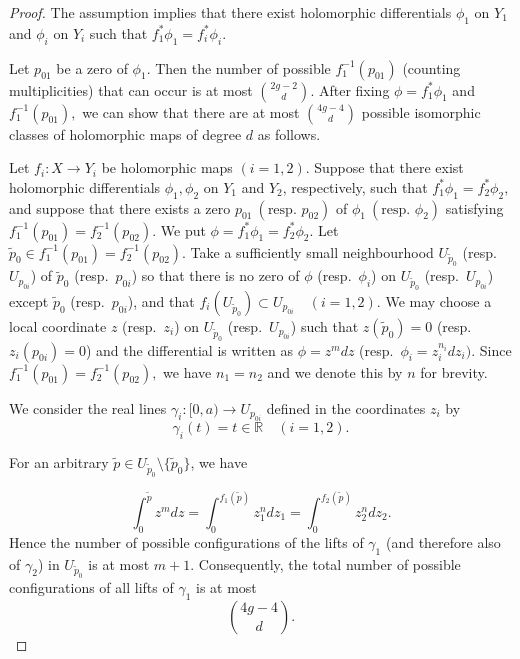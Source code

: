 \documentclass[11pt]{article}
\numberwithin{equation}{section}
\theoremstyle{plain}
\begin{document}
\begin{proof}
The assumption implies that there exist holomorphic differentials
$\phi_{1}
$ on \(Y_{1}\) and
$\phi_{i}
$ on \(Y_{i}\) such that 
$f_{1}^{*}\phi_{1}=f_{i}^{*}\phi_{i}.
$

Let \(p_{01}\) be a zero of \(\phi_{1}\). Then the number of possible
$f_{1}^{-1}(p_{01})
$ (counting multiplicities) that can occur is at most
$\binom{2g-2}{d}.
$ After fixing
$\phi=f_{1}^{*}\phi_{1}
$ and
$f_{1}^{-1}(p_{01}),
$ we can show that there are at most
$\binom{4g-4}{d}
$ possible isomorphic classes of holomorphic maps of degree \(d\) as follows.

Let
$f_{i}:X\to Y_{i}
$ be holomorphic maps \((i=1,2)\).
Suppose that there exist holomorphic differentials
$\phi_{1},\phi_{2}
$ on $Y_{1}$ and $Y_{2}$, respectively, such that
$f_{1}^{*}\phi_{1}=f_{2}^{*}\phi_{2},
$ and suppose that there exists a zero
$p_{01}\ (\text{resp. }p_{02})
$ of
$\phi_{1}\ (\text{resp. }\phi_{2})
$ satisfying
$f_{1}^{-1}(p_{01})=f_{2}^{-1}(p_{02}).
$ We put
$\phi=f_{1}^{*}\phi_{1}=f_{2}^{*}\phi_{2}.
$ Let
$\tilde p_{0}\in f_{1}^{-1}(p_{01})=f_{2}^{-1}(p_{02}).
$
Take a sufficiently small neighbourhood
$U_{\tilde p_{0}}
$ (resp.\ \(U_{p_{0i}}\))
of
$\tilde p_{0}
$ (resp.\ \(p_{0i}\))
so that there is no zero of \(\phi\)
(resp.\ \(\phi_{i}\))
on \(U_{\tilde p_{0}}\)
(resp.\ \(U_{p_{0i}}\))
except
$\tilde p_{0}
$ (resp.\ \(p_{0i}\)),
and that
$f_{i}(U_{\tilde p_{0}})\subset U_{p_{0i}}
\quad (i=1,2).
$ We may choose a local coordinate
$z
$ (resp.\ \(z_{i}\))
on
$U_{\tilde p_{0}}
$ (resp.\ \(U_{p_{0i}}\))
such that
$z(\tilde p_{0})=0
$ (resp.\ \(z_{i}(p_{0i})=0\))
and the differential is written as
$\phi=z^{m}dz
$ (resp.\
$\phi_{i}=z_{i}^{n_{i}}dz_{i}).
$
Since
$f_{1}^{-1}(p_{01})=f_{2}^{-1}(p_{02}),
$ we have
$n_{1}=n_{2}
$ and we denote this by \(n\) for brevity.

We consider the real lines
$\gamma_{i}:[0,a)\to U_{p_{0i}}
$ defined in the coordinates $z_i$ by
$$\gamma_{i}(t)=t\in\mathbb R\quad (i=1,2).$$


For an arbitrary
$\tilde p\in U_{\tilde p_{0}}\setminus\{\tilde p_{0}\}$,
we have

$$\int_{0}^{\tilde p} z^{m}dz
=
\int_{0}^{f_{1}(\tilde p)} z_{1}^{n}dz_{1}
=
\int_{0}^{f_{2}(\tilde p)} z_{2}^{n}dz_{2}.
$$
Hence the number of possible configurations of the lifts of
$\gamma_{1}
$ 
(and therefore also of \(\gamma_{2}\))
in
$U_{\tilde p_{0}}
$ is at most
$m+1.
$ 
Consequently, the total number of possible configurations of all lifts of
$\gamma_{1}
$ is at most
$$\binom{4g-4}{d}.
$$


\end{proof}
\end{document}
